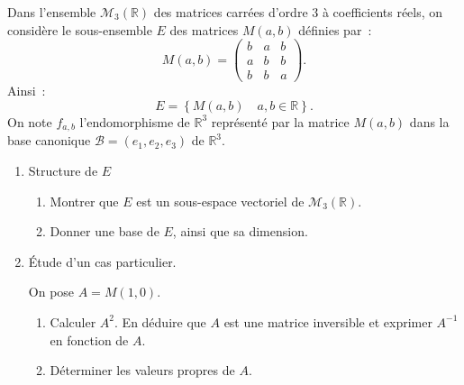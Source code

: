


\begin{exercice}

Dans l'ensemble $\mathcal{M}_{3}(\mathbb{R})$ des matrices carr\'{e}es
d'ordre $3$ \`{a} coefficients r\'{e}els, on consid\`{e}re le sous-ensemble $%
E$ des matrices $M(a,b)$ d\'{e}finies par~: 
\begin{equation*}
M(a,b)=\left( 
\begin{array}{ccc}
b & a & b \\ 
a & b & b \\ 
b & b & a%
\end{array}
\right) .
\end{equation*}
Ainsi~: 
\begin{equation*}
E=\left\{ M(a,b)\quad a,b\in \mathbb{R}\right\} .
\end{equation*}
On note $f_{a,b}$ l'endomorphisme de $\mathbb{R}^{3}$ repr\'{e}sent\'{e} par
la matrice $M(a,b)$ dans la base canonique $\mathcal{B}=(e_{1},e_{2},e_{3})$
de $\mathbb{R}^{3}$.

\begin{enumerate}


\item Structure de $E$


\begin{enumerate}
\item Montrer que $E$ est un sous-espace vectoriel de $\mathcal{M}_{3}(%
\mathbb{R})$.

\item Donner une base de $E$, ainsi que sa dimension.
\end{enumerate}







\item \'Etude d'un cas particulier.

On pose $A=M(1,0)$.

\begin{enumerate}
\item Calculer $A^{2}$. En d\'{e}duire que $A$ est une matrice inversible et
exprimer $A^{-1}$ en fonction de $A$.

\item D\'{e}terminer les valeurs propres de $A$.


\end{enumerate}
\end{enumerate}
\end{exercice}
